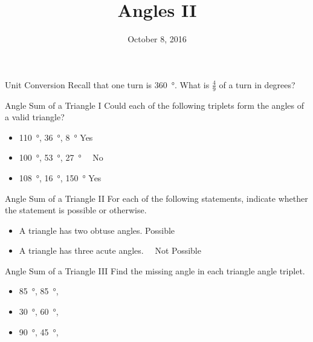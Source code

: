 \documentclass[14pt,letterpaper]{article}
\title{Angles II}
\date{October 8, 2016}
\begin{document}
\HomeworkTitle

\thispagestyle{empty}

\begin{problem}{Unit Conversion}
  Recall that one turn is \SI{360}{\degree}. What is \(\frac{4}{9}\) of a turn
  in degrees? 
\end{problem}

\begin{problem}{Angle Sum of a Triangle I}
 Could each of the following triplets form the angles of a valid triangle?

 \begin{itemize}
  \item \SI{110}{\degree}, \SI{36}{\degree}, \SI{8}{\degree}
  \hfill Yes~~
  \item \SI{100}{\degree}, \SI{53}{\degree}, \SI{27}{\degree}
  \hfill {}~~No
  \item \SI{108}{\degree}, \SI{16}{\degree}, \SI{150}{\degree}
  \hfill Yes~~
 \end{itemize}
\end{problem}

\begin{problem}{Angle Sum of a Triangle II}
 For each of the following statements, indicate whether the statement is
 possible or otherwise.

 \begin{itemize}
  \item A triangle has two obtuse angles.
  \hfill Possible~~
  \item A triangle has three acute angles.
  \hfill {}~~Not Possible
 \end{itemize}
\end{problem}

\begin{problem}{Angle Sum of a Triangle III}
 Find the missing angle in each triangle angle triplet.

 \begin{itemize}
  \item \SI{85}{\degree}, \SI{85}{\degree},
  \item \SI{30}{\degree}, \SI{60}{\degree},
  \item \SI{90}{\degree}, \SI{45}{\degree},
 \end{itemize}
\end{problem}
\end{document}
